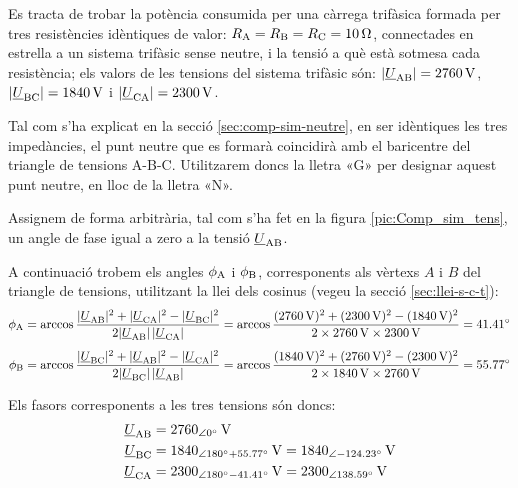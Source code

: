 \begin{exemple}\label{ex:ImpedEquil}
	\addcontentsxms{\ImpedEquil}
    Es tracta de trobar la potència consumida per una càrrega trifàsica
    formada per tres resistències idèntiques de valor: $R_\mathrm{A}=R_\mathrm{B}=R_\mathrm{C}=\qty{10}{\ohm}$,
    connectades en estrella a un sistema trifàsic sense neutre, i la
    tensió a què està sotmesa cada resistència; els valors de les
    tensions del sistema trifàsic són: $|\underline{U}_\mathrm{AB}| =
    \qty{2760}{V}$, $|\underline{U}_\mathrm{BC}| = \qty{1840}{V}$ i
    $|\underline{U}_\mathrm{CA}| = \qty{2300}{V}$.

    Tal com s'ha explicat en la secció \vref{sec:comp-sim-neutre}, en ser idèntiques les tres impedàncies, el punt neutre que es formarà coincidirà amb el baricentre del triangle de tensions A-B-C. Utilitzarem doncs la lletra «G» per designar aquest punt neutre, en lloc de la lletra «N».

    Assignem de forma arbitrària, tal com s'ha fet en la figura
    \vref{pic:Comp_sim_tens}, un angle de fase igual a zero a la tensió
    $\underline{U}_\mathrm{AB}$.

    \begin{center}
        
    \end{center}

    A continuació trobem els angles $\phi_\mathrm{A}$ i $\phi_\mathrm{B}$,
    corresponents als vèrtexs  $A$ i $B$ del triangle de
    tensions, utilitzant la llei dels cosinus (vegeu la secció
    \vref{sec:llei-s-c-t}): 
    \begin{align*}
        \phi_\mathrm{A} &= \arccos \frac{|\underline{U}_\mathrm{AB}|^2 + |\underline{U}_\mathrm{CA}|^2 -
        |\underline{U}_\mathrm{BC}|^2}{2 |\underline{U}_\mathrm{AB}| \,|\underline{U}_\mathrm{CA}|} =
        \arccos \frac{(\qty{2760}{V})^2 + (\qty{2300}{V})^2 - (\qty{1840}{V})^2}{2 \times \qty{2760}{V}
        \times \qty{2300}{V}} = \ang{41,41} \\[1ex]
        \phi_\mathrm{B} &= \arccos \frac{|\underline{U}_\mathrm{BC}|^2 + |\underline{U}_\mathrm{AB}|^2 -
        |\underline{U}_\mathrm{CA}|^2}{2 |\underline{U}_\mathrm{BC}| \,|\underline{U}_\mathrm{AB}|} =
        \arccos \frac{(\qty{1840}{V})^2 + (\qty{2760}{V})^2 - (\qty{2300}{V})^2}{2 \times \qty{1840}{V}
        \times \qty{2760}{V}} = \ang{55,77}
    \end{align*}

    Els fasors corresponents a les tres tensions són doncs:
    \begin{align*}
    \cmplx{U}\ped{AB} &= \qtypd{2760}{0}{V} \\
    \cmplx{U}\ped{BC} &= \num{1840}_{\angle\ang{180} + \ang{55,77}}\unit{\,V} =
    \qtypd{1840}{-124,23}{V} \\
    \cmplx{U}\ped{CA} &= \num{2300}_{\angle\ang{180} - \ang{41,41}}\unit{\,V} = \qtypd{2300}{138,59}{V}
    \end{align*}


\end{exemple}
